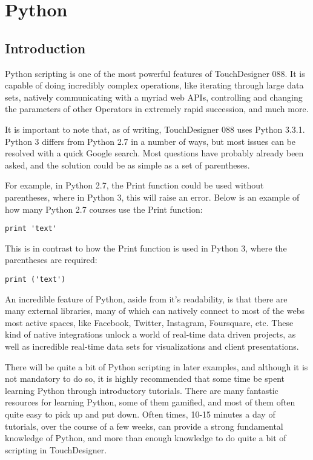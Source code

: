 \cleardoublepage
\chapter{Python}
\label{ch:9}


\section{Introduction}

\begin{fullwidth}
Python scripting is one of the most powerful features of TouchDesigner 088. It is capable of doing incredibly complex operations, like iterating through large data sets, natively communicating with a myriad web APIs, controlling and changing the parameters of other Operators in extremely rapid succession, and much more.

It is important to note that, as of writing, TouchDesigner 088 uses Python 3.3.1. Python 3 differs from Python 2.7 in a number of ways, but most issues can be resolved with a quick Google search. Most questions have probably already been asked, and the solution could be as simple as a set of parentheses.

For example, in Python 2.7, the Print function could be used without parentheses, where in Python 3, this will raise an error. Below is an example of how many Python 2.7 courses use the Print function:

\begin{lstlisting}
print 'text'
\end{lstlisting}

This is in contrast to how the Print function is used in Python 3, where the parentheses are required:

\begin{lstlisting}
print ('text')
\end{lstlisting}

An incredible feature of Python, aside from it's readability, is that there are many external libraries, many of which can natively connect to most of the webs most active spaces, like Facebook, Twitter, Instagram, Foursquare, etc. These kind of native integrations unlock a world of real-time data driven projects, as well as incredible real-time data sets for visualizations and client presentations.

There will be quite a bit of Python scripting in later examples, and although it is not mandatory to do so, it is highly recommended that some time be spent learning Python through introductory tutorials. There are many fantastic resources for learning Python, some of them gamified, and most of them often quite easy to pick up and put down. Often times, 10-15 minutes a day of tutorials, over the course of a few weeks, can provide a strong fundamental knowledge of Python, and more than enough knowledge to do quite a bit of scripting in TouchDesigner.
\end{fullwidth}


